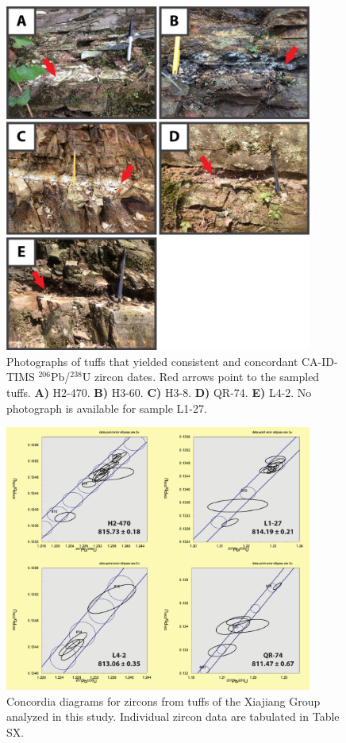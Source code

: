 \begin{figure}[h!]
    \centering
    \includegraphics[width=0.9\textwidth]{figures/Xiajiang/tuff-photos.jpg}
    \caption[Photographs of tuffs in the Xiajiang Group.]{Photographs of tuffs that yielded consistent and concordant CA-ID-TIMS $^{206}$Pb/$^{238}$U zircon dates. Red arrows point to the sampled tuffs. \textbf{A)} H2-470. \textbf{B)} H3-60. \textbf{C)} H3-8. \textbf{D)} QR-74. \textbf{E)} L4-2. No photograph is available for sample L1-27.}
    \label{fig:tuff-photos}
\end{figure}

\begin{figure}[h!]
    \centering
    \includegraphics[width=0.9\textwidth]{figures/Xiajiang/concordia-1.pdf}
    \caption[Concordia diagrams for zircons from tuffs of the Xiajiang Group.]{Concordia diagrams for zircons from tuffs of the Xiajiang Group analyzed in this study. Individual zircon data are tabulated in Table SX.}
    \label{fig:concordia-1}
\end{figure}

